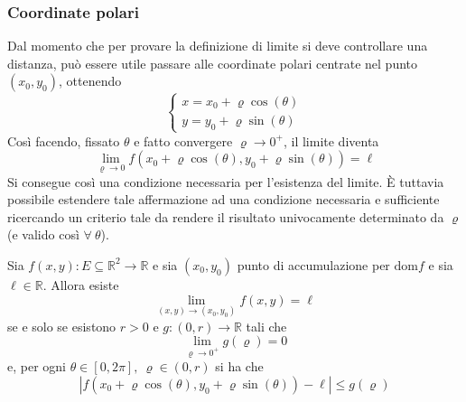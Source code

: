 \subsubsection{Coordinate polari}
Dal momento che per provare la definizione di limite si deve controllare una distanza, può essere utile passare alle coordinate polari centrate nel punto $(x_0, y_0)$, ottenendo
\begin{equation}
    \begin{cases}
        x=x_0+ \varrho \cos(\theta)\\
        y=y_0+ \varrho \sin(\theta)
    \end{cases}
\end{equation}
Così facendo, fissato $\theta$ e fatto convergere $\varrho \to 0^+$, il limite diventa
\begin{equation}
    \lim_{\varrho\to 0}{f(x_0+\varrho\cos(\theta), y_0+\varrho\sin(\theta))}=\ell
\end{equation}
Si consegue così una condizione necessaria per l'esistenza del limite. È tuttavia possibile estendere tale affermazione ad una condizione necessaria e sufficiente ricercando un criterio tale da rendere il risultato univocamente determinato da $\varrho$ (e valido così $\forall\ \theta$).
\begin{theorem} \label{Teo: Condizione necessaria e sufficiente per un limite}
    Sia $f(x,y): E \subseteq \mathbb{R}^2 \to \mathbb{R}$ e sia $(x_0, y_0)$ punto di accumulazione per $\text{dom}f$ e sia $\ell \in \mathbb{R}$. Allora esiste
    \begin{equation}
        \lim_{(x,y)\to(x_0, y_0)}f(x,y)=\ell
    \end{equation}
    se e solo se esistono $r>0$ e $g:(0, r) \to \mathbb{R}$ tali che
    \begin{equation}
        \lim_{\varrho \to 0^+}{g(\varrho)=0}
    \end{equation}
    e, per ogni $\theta \in [0, 2\pi],\ \varrho\in (0, r)$ si ha che 
    \begin{equation}
        \left|f(x_0+\varrho\cos(\theta), y_0+\varrho\sin(\theta))-\ell \right|\leq g(\varrho)
    \end{equation}
\end{theorem}
